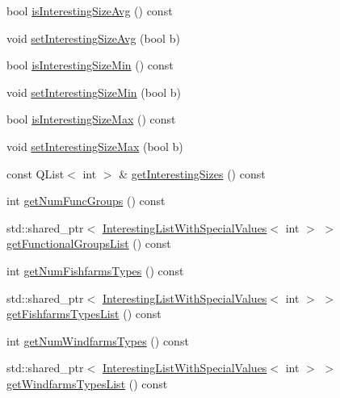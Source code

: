 \begin{DoxyCompactItemize}
\item 
bool \mbox{\hyperlink{class_displace_model_ae1be69ab922ef18f9da9b59d28540bfe}{is\+Interesting\+Size\+Avg}} () const
\item 
void \mbox{\hyperlink{class_displace_model_acad548d2cc015a1761a21dd2f9c81885}{set\+Interesting\+Size\+Avg}} (bool b)
\item 
bool \mbox{\hyperlink{class_displace_model_a9493dcb21eab814aa456331d90d4ee4e}{is\+Interesting\+Size\+Min}} () const
\item 
void \mbox{\hyperlink{class_displace_model_a972274499166bb0e43bceac6bf9bb884}{set\+Interesting\+Size\+Min}} (bool b)
\item 
bool \mbox{\hyperlink{class_displace_model_ab80f0e704341132ab80f47770d9c2b66}{is\+Interesting\+Size\+Max}} () const
\item 
void \mbox{\hyperlink{class_displace_model_ae03f2dba788e9c65fc6bee788e1e12e1}{set\+Interesting\+Size\+Max}} (bool b)
\item 
const Q\+List$<$ int $>$ \& \mbox{\hyperlink{class_displace_model_a44ea10262f0742a6939d398571e5ba1c}{get\+Interesting\+Sizes}} () const
\item 
int \mbox{\hyperlink{class_displace_model_a1855205cd955f8656c3d066e17d0319e}{get\+Num\+Func\+Groups}} () const
\item 
std\+::shared\+\_\+ptr$<$ \mbox{\hyperlink{class_interesting_list_with_special_values}{Interesting\+List\+With\+Special\+Values}}$<$ int $>$ $>$ \mbox{\hyperlink{class_displace_model_a79d7922027537fa190c72c22cc297f6a}{get\+Functional\+Groups\+List}} () const
\item 
int \mbox{\hyperlink{class_displace_model_a3dc33804ebeda976a9bcf3d4df30f108}{get\+Num\+Fishfarms\+Types}} () const
\item 
std\+::shared\+\_\+ptr$<$ \mbox{\hyperlink{class_interesting_list_with_special_values}{Interesting\+List\+With\+Special\+Values}}$<$ int $>$ $>$ \mbox{\hyperlink{class_displace_model_a02e92c4e586fb032e89c6d279272c6ea}{get\+Fishfarms\+Types\+List}} () const
\item 
int \mbox{\hyperlink{class_displace_model_a962efd86a2cd6bccbbef5944e46ff263}{get\+Num\+Windfarms\+Types}} () const
\item 
std\+::shared\+\_\+ptr$<$ \mbox{\hyperlink{class_interesting_list_with_special_values}{Interesting\+List\+With\+Special\+Values}}$<$ int $>$ $>$ \mbox{\hyperlink{class_displace_model_afe5c60783bd92ec7c3eb3554c1facccf}{get\+Windfarms\+Types\+List}} () const
\item 

\end{DoxyCompactItemize}
